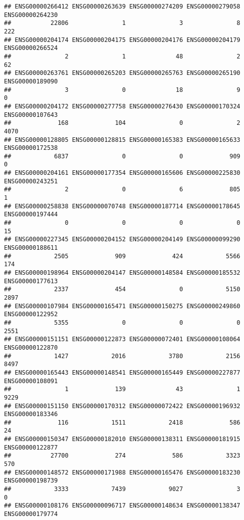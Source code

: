 \documentclass[
]{article}
\begin{document}
\begin{verbatim}
## ENSG00000266412 ENSG00000263639 ENSG00000274209 ENSG00000279058 ENSG00000264230 
##           22806               1               3               8             222 
## ENSG00000204174 ENSG00000204175 ENSG00000204176 ENSG00000204179 ENSG00000266524 
##               2               1              48               2              62 
## ENSG00000263761 ENSG00000265203 ENSG00000265763 ENSG00000265190 ENSG00000189090 
##               3               0              18               9               0 
## ENSG00000204172 ENSG00000277758 ENSG00000276430 ENSG00000170324 ENSG00000107643 
##             168             104               0               2            4070 
## ENSG00000128805 ENSG00000128815 ENSG00000165383 ENSG00000165633 ENSG00000172538 
##            6837               0               0             909               0 
## ENSG00000204161 ENSG00000177354 ENSG00000165606 ENSG00000225830 ENSG00000243251 
##               2               0               6             805               1 
## ENSG00000258838 ENSG00000070748 ENSG00000187714 ENSG00000178645 ENSG00000197444 
##               0               0               0               0              15 
## ENSG00000227345 ENSG00000204152 ENSG00000204149 ENSG00000099290 ENSG00000188611 
##            2505             909             424            5566             174 
## ENSG00000198964 ENSG00000204147 ENSG00000148584 ENSG00000185532 ENSG00000177613 
##            2337             454               0            5150            2897 
## ENSG00000107984 ENSG00000165471 ENSG00000150275 ENSG00000249860 ENSG00000122952 
##            5355               0               0               0            2551 
## ENSG00000151151 ENSG00000122873 ENSG00000072401 ENSG00000108064 ENSG00000122870 
##            1427            2016            3780            2156            8497 
## ENSG00000165443 ENSG00000148541 ENSG00000165449 ENSG00000227877 ENSG00000108091 
##               1             139              43               1            9229 
## ENSG00000151150 ENSG00000170312 ENSG00000072422 ENSG00000196932 ENSG00000183346 
##             116            1511            2418             586              24 
## ENSG00000150347 ENSG00000182010 ENSG00000138311 ENSG00000181915 ENSG00000122877 
##           27700             274             586            3323             570 
## ENSG00000148572 ENSG00000171988 ENSG00000165476 ENSG00000183230 ENSG00000198739 
##            3333            7439            9027               3               0 
## ENSG00000108176 ENSG00000096717 ENSG00000148634 ENSG00000138347 ENSG00000179774 

\end{verbatim}
\end{document}

